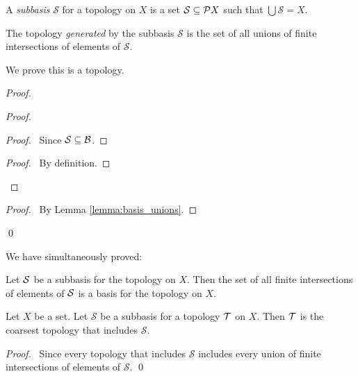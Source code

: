\begin{definition}[Subbasis]
    A \emph{subbasis} $\mathcal{S}$ for a topology on $X$ is a set $\mathcal{S} \subseteq \mathcal{P} X$ such that
    $\bigcup \mathcal{S} = X$.

    The topology \emph{generated} by the subbasis $\mathcal{S}$ is the set of all unions of finite
    intersections of elements of $\mathcal{S}$.
\end{definition}

We prove this is a topology.

\begin{proof}
    \pf
    \begin{proof}
        \begin{proof}
            \pf\ Since $\mathcal{S} \subseteq \mathcal{B}$.
        \end{proof}
        \begin{proof}
            \pf\ By definition.
        \end{proof}
    \end{proof}
    \qedstep
    \begin{proof}
        \pf\ By Lemma \ref{lemma:basis_unions}.
    \end{proof}
    \qed
\end{proof}

We have simultaneously proved:

\begin{proposition}
    \label{proposition:subbasis_basis}
    Let $\mathcal{S}$ be a subbasis for the topology on $X$.
    Then the set of all finite intersections of elements of $\mathcal{S}$
    is a basis for the topology on $X$.
\end{proposition}

\begin{proposition}
    \label{proposition:subbasis_coarsest}
    Let $X$ be a set. Let $\mathcal{S}$ be a subbasis for a topology $\mathcal{T}$ on $X$. Then $\mathcal{T}$ is the coarsest topology
    that includes $\mathcal{S}$.
\end{proposition}

\begin{proof}
    \pf\ Since every topology that includes $\mathcal{S}$ includes every union of finite intersections of
    elements of $\mathcal{S}$. \qed
\end{proof}

